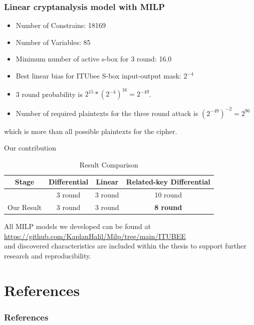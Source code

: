 \documentclass{beamer}
\begin{document}
\begin{frame}
\frametitle{Linear cryptanalysis model with MILP}
\begin{itemize}
    \item Number of Constrains:  18169
    \item Number of Variables:  85
    \item Minimum number of active s-box for 3 round:  16.0
    \item Best linear bias for ITUbee S-box input-output mask: $2^{-4}$
    \item 3 round probability is $2^{15}*(2^{-4})^{16}=2^{-49}$. \cite{matsui1993linear}
    \item Number of required plaintexts for the three round attack is $(2^{-49})^{-2}= 2 ^{96}$ \cite{matsui1993linear}
\end{itemize}


which is more than all possible plaintexts for the cipher. 
  


\end{frame}
\begin{frame}{Our contribution}


\begin{table}[ht]
    \footnotesize
    \centering
    \begin{tabular}{|c|c|c|c|}
        \hline
        \textbf{Stage} & \textbf{Differential} & \textbf{Linear}  & \textbf{Related-key Differential}  \\
        \hline
        \cite{karakocc2013itubee}  & 3 round & 3 round & 10 round \\
        \hline
        Our Result & 3 round & 3 round & \textbf{8 round }  \\  
        \hline
    \end{tabular}
    \caption{Result Comparison}
    \label{tab:RelatedKeyDif}
\end{table}

All MILP models we developed can be found at \\
\url{https://github.com/KaplanHalil/Milp/tree/main/ITUBEE} \\
and discovered characteristics 
are included within the thesis  to support further research and reproducibility.


\end{frame}

\section{References}

\begin{frame}
\frametitle{References}

\printbibliography

\end{frame}
\end{document}
